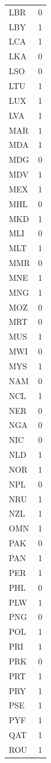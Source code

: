 \begin{tabular}{ll}
LBR & 0 \\
LBY & 1 \\
LCA & 1 \\
LKA & 0 \\
LSO & 0 \\
LTU & 1 \\
LUX & 1 \\
LVA & 1 \\
MAR & 1 \\
MDA & 1 \\
MDG & 0 \\
MDV & 1 \\
MEX & 1 \\
MHL & 0 \\
MKD & 1 \\
MLI & 0 \\
MLT & 1 \\
MMR & 0 \\
MNE & 1 \\
MNG & 1 \\
MOZ & 0 \\
MRT & 0 \\
MUS & 1 \\
MWI & 0 \\
MYS & 1 \\
NAM & 0 \\
NCL & 1 \\
NER & 0 \\
NGA & 0 \\
NIC & 0 \\
NLD & 1 \\
NOR & 1 \\
NPL & 0 \\
NRU & 1 \\
NZL & 1 \\
OMN & 1 \\
PAK & 0 \\
PAN & 1 \\
PER & 1 \\
PHL & 0 \\
PLW & 1 \\
PNG & 0 \\
POL & 1 \\
PRI & 1 \\
PRK & 0 \\
PRT & 1 \\
PRY & 1 \\
PSE & 1 \\
PYF & 1 \\
QAT & 1 \\
ROU & 1 \\

\end{tabular}
